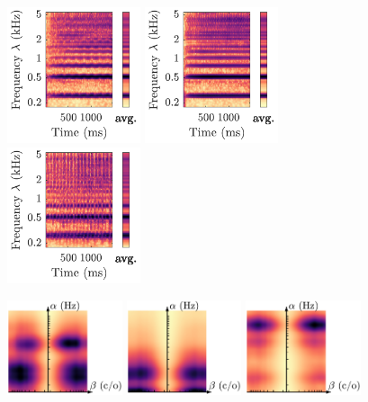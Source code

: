 \documentclass{bmcart}
\begin{document}
\begin{backmatter}
\begin{figure}
\includegraphics[height=4cm]{figures/violin_scattering/Vn-ord-C4-mf-4c_scalogram.pdf}
\hspace{8mm}
\includegraphics[trim=35 0 0 0, clip, height=4cm]{figures/violin_scattering/Vn-nonvib-C4-mf-4c_scalogram.pdf}
\hspace{12mm}
\includegraphics[trim=35 0 0 0, clip, height=4cm]{figures/violin_scattering/Vn-trem-C4-mf-4c_scalogram.pdf}

\hspace{2mm}
\includegraphics[height=28mm]{figures/violin_scattering/Vn-ord-C4-mf-4c_scattering.pdf}
\hspace{5mm}
\includegraphics[height=28mm]{figures/violin_scattering/Vn-nonvib-C4-mf-4c_scattering.pdf}
\hspace{5mm}
\includegraphics[trim=0 0 77 0, clip, height=28mm]{figures/violin_scattering/Vn-trem-C4-mf-4c_scattering.pdf}


\end{figure}
\end{backmatter}
\end{document}
